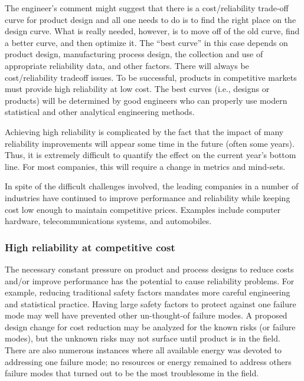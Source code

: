 The engineer's comment might suggest that there is a
cost/reliability trade-off curve for product design and all one
needs to do is to find the right place on the design curve.  What is
really needed, however, is to move off of the old curve, find a
better curve, and then optimize it. The ``best curve'' in this case
depends on product design, manufacturing process design, the
collection and use of appropriate reliability data, and other
factors. There will always be cost/reliability tradeoff issues. To
be successful, products in competitive markets must provide high
reliability at low cost. The best curves (i.e., designs or products)
will be determined by good engineers who can properly use modern
statistical and other analytical engineering methods.

Achieving high reliability is complicated by the fact that the
impact of many reliability improvements will appear some time in the
future (often some years). Thus, it is extremely difficult to
quantify the effect on the current year's bottom line. For most
companies, this will require a change in metrics and mind-sets.

In spite of the difficult challenges involved, the leading companies
in a number of industries have continued to improve performance and
reliability while keeping cost low enough to maintain competitive
prices.  Examples include computer hardware, telecommunications
systems, and automobiles.

\subsubsection{High reliability at competitive cost} 
The necessary constant pressure on product and process designs to
reduce costs and/or improve performance has the potential to cause
reliability problems.  For example, reducing traditional safety
factors mandates more careful engineering and statistical
practice. Having large safety factors to protect against one
failure mode may well have prevented other un-thought-of failure
modes. A proposed design change for cost reduction may be analyzed
for the known risks (or failure modes), but the unknown risks may
not surface until product is in the field. There are also numerous
instances where all available energy was devoted to addressing one
failure mode; no resources or energy remained to address others
failure modes that turned out to be the most troublesome in the
field.

